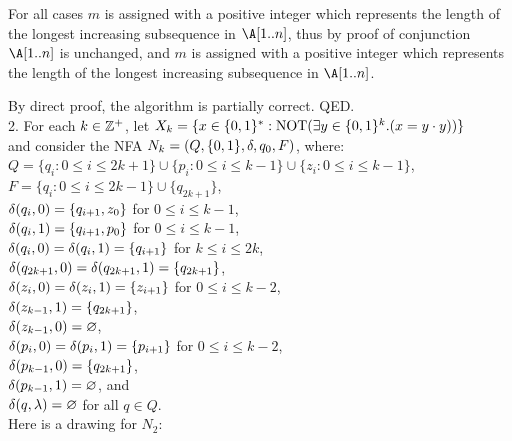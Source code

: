 \documentclass[11pt, sakura, night, 1in]{hw}
\begin{document}
{    For all cases $m$ is assigned with a positive integer which represents the length of the longest increasing subsequence in $\A[1..n]$, thus by proof of conjunction $\A[1..n]$ is unchanged, and $m$ is assigned with a positive integer which represents the length of the longest increasing subsequence in $\A[1..n]$.   
}

By direct proof, the algorithm is partially correct. QED.\\


2. For each $k \in \mathbb{Z}^+$, let 
$ X_k = \{x \in \{0,1\}^*  :  \mathrm{NOT} (\exists y \in \{0,1\}^k. (x = y\cdot y))\}$\\
and  consider the NFA $N_k = (Q, \{0,1\}, \delta, q_{0}, F)$,   where:\\
$Q = \{ q_i :  0 \le i \le 2k+1 \} \cup \{p_i : 0 \le i \le k-1\} \cup \{z_i  : 0 \le i \le k-1\}$,\\
$F =  \{q_i  :  0 \le i \le 2k -1 \} \cup \{q_{2k+1}\}$,\\
$\delta(q_i, 0) = \{q_{i+1}, z_0 \}$  for $0 \le i \le k-1$,\\
$\delta(q_i, 1) = \{q_{i+1}, p_0 \}$  for $0 \le i \le k-1$,\\
$\delta(q_i,0) = \delta(q_i,1) = \{q_{i+1}\}$ for $k \le i \le 2k$,\\
$\delta(q_{2k+1},0) = \delta(q_{2k+1},1) = \{q_{2k+1}\}$, \\
$\delta(z_i, 0) = \delta(z_i,1) = \{z_{i+1}\}$  for  $0 \le i \le k-2$,\\
$\delta(z_{k-1},1) =  \{q_{2k+1}\}$,\\
$\delta(z_{k-1},0) =  \varnothing$,\\ 
$\delta(p_i, 0) = \delta(p_i,1) = \{p_{i+1}\}$  for  $0 \le i \le k-2$,\\
$\delta(p_{k-1},0) =   \{q_{2k+1}\}$,\\
$\delta(p_{k-1},1) =  \varnothing$, and\\
$\delta(q,\lambda) = \varnothing$ for all $q \in Q$.\\

Here is a drawing for $N_2$:
\end{document}
